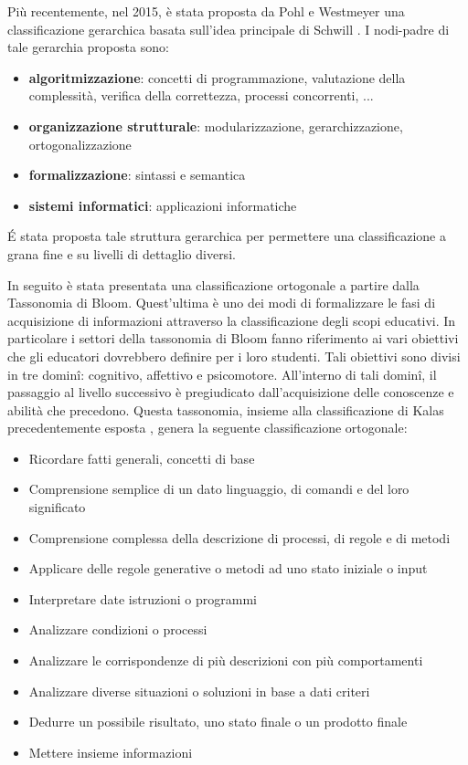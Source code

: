 \documentclass[12pt]{report}
\begin{document}
Più recentemente, nel 2015, è stata proposta da Pohl e Westmeyer \cite{PohlLNCS2015} una classificazione gerarchica basata sull'idea principale di Schwill \cite{SchwillEATCS1994}.
I nodi-padre di tale gerarchia proposta sono:
\begin{itemize}
	\item \textbf{algoritmizzazione}: concetti di programmazione, valutazione della complessità, verifica della correttezza, processi concorrenti, ... 
	\item \textbf{organizzazione strutturale}: modularizzazione, gerarchizzazione, ortogonalizzazione
	\item \textbf{formalizzazione}: sintassi e semantica
	\item \textbf{sistemi informatici}: applicazioni informatiche
\end{itemize}

\'{E} stata proposta tale struttura gerarchica per permettere una classificazione a grana fine e su livelli di dettaglio diversi.

In seguito è stata presentata una classificazione ortogonale \cite{DagieneKEYCIT2015} a partire dalla Tassonomia di Bloom.
Quest'ultima è uno dei modi di formalizzare le fasi di acquisizione di informazioni attraverso la classificazione degli scopi educativi. In particolare i settori della tassonomia di Bloom fanno riferimento ai vari obiettivi che gli educatori dovrebbero definire per i loro studenti. Tali obiettivi sono divisi in tre domin\^{i}: cognitivo, affettivo e psicomotore. All'interno di tali domin\^{i}, il passaggio al livello successivo è pregiudicato dall'acquisizione delle conoscenze e abilità che precedono.
Questa tassonomia, insieme alla classificazione di Kalas precedentemente esposta \cite{KalasIFIP2009}, genera la seguente classificazione ortogonale:
\begin{itemize}
	\item Ricordare fatti generali, concetti di base
	\item Comprensione semplice di un dato linguaggio, di comandi e del loro significato
	\item Comprensione complessa della descrizione di processi, di regole e di metodi
	\item Applicare delle regole generative o metodi ad uno stato iniziale o input
	\item Interpretare date istruzioni o programmi
	\item Analizzare condizioni o processi
	\item Analizzare le corrispondenze di più descrizioni con più comportamenti
	\item Analizzare diverse situazioni o soluzioni in base a dati criteri
	\item Dedurre un possibile risultato, uno stato finale o un prodotto finale
	\item Mettere insieme informazioni
\end{itemize}
\end{document}
